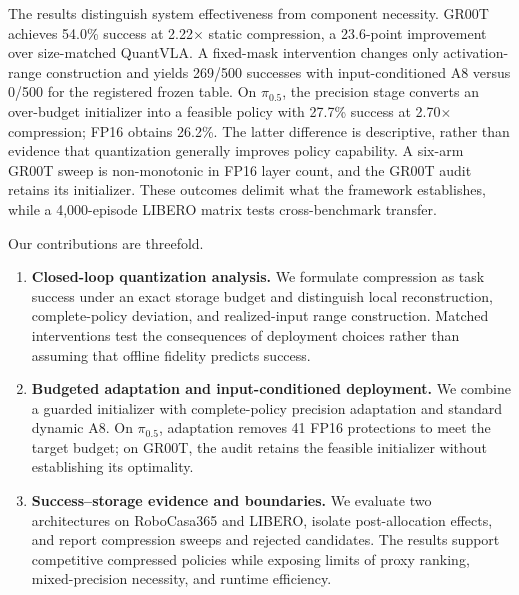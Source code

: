 

The results distinguish system effectiveness from component necessity. GR00T achieves 54.0\% success at 2.22$\times$ static compression, a 23.6-point improvement over size-matched QuantVLA. A fixed-mask intervention changes only activation-range construction and yields 269/500 successes with input-conditioned A8 versus 0/500 for the registered frozen table. On $\pi_{0.5}$, the precision stage converts an over-budget initializer into a feasible policy with 27.7\% success at 2.70$\times$ compression; FP16 obtains 26.2\%. The latter difference is descriptive, rather than evidence that quantization generally improves policy capability. A six-arm GR00T sweep is non-monotonic in FP16 layer count, and the GR00T audit retains its initializer. These outcomes delimit what the framework establishes, while a 4,000-episode LIBERO matrix tests cross-benchmark transfer.

Our contributions are threefold.
\begin{enumerate}[label=(\arabic*)]
    \item \textbf{Closed-loop quantization analysis.} We formulate compression as task success under an exact storage budget and distinguish local reconstruction, complete-policy deviation, and realized-input range construction. Matched interventions test the consequences of deployment choices rather than assuming that offline fidelity predicts success.
    \item \textbf{Budgeted adaptation and input-conditioned deployment.} We combine a guarded initializer with complete-policy precision adaptation and standard dynamic A8. On $\pi_{0.5}$, adaptation removes 41 FP16 protections to meet the target budget; on GR00T, the audit retains the feasible initializer without establishing its optimality.
    \item \textbf{Success--storage evidence and boundaries.} We evaluate two architectures on RoboCasa365 and LIBERO, isolate post-allocation effects, and report compression sweeps and rejected candidates. The results support competitive compressed policies while exposing limits of proxy ranking, mixed-precision necessity, and runtime efficiency.
\end{enumerate}